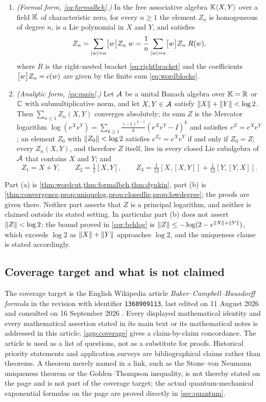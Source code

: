 \begin{theorem}\label{thm:bch}
\begin{enumerate}[label=(\alph*)]
\item \emph{(Formal form, \eqref{eq:formalbch}.)} In the free associative
algebra $\mathbb{K}\langle X,Y\rangle$ over a field $\mathbb{K}$ of characteristic zero,
for every $n\geq1$ the element $Z_n$ is homogeneous of degree $n$, is a Lie
polynomial in $X$ and $Y$, and satisfies
\[
 Z_n=\sum_{|w|=n}\bigl[w\bigr]Z_n\;w
 =\frac1n\sum_{|w|=n}\bigl[w\bigr]Z_n\;R(w),
\]
where $R$ is the right-nested bracket \eqref{eq:rightbracket} and the
coefficients $\bigl[w\bigr]Z_n=c(w)$ are given by the finite sum
\eqref{eq:wordblocks}.
\item \emph{(Analytic form, \eqref{eq:main}.)} Let $\mathcal{A}$ be a unital Banach
algebra over $\mathbb{K}=\mathbb{R}$ or $\mathbb{C}$ with submultiplicative norm, and let
$X,Y\in\mathcal{A}$ satisfy $\left\lVert X\right\rVert+\left\lVert Y\right\rVert<\log2$. Then $\sum_{n\geq1}Z_n(X,Y)$
converges absolutely; its sum $Z$ is the Mercator logarithm
$\log(e^Xe^Y)=\sum_{k\geq1}\frac{(-1)^{k-1}}k(e^Xe^Y-I)^k$ and satisfies
$e^Z=e^Xe^Y$; an element $Z_0$
with $\left\lVert Z_0\right\rVert<\log2$ satisfies $e^{Z_0}=e^Xe^Y$ if and only if $Z_0=Z$;
every $Z_n(X,Y)$, and therefore $Z$ itself, lies in every closed Lie
subalgebra of $\mathcal{A}$ that contains $X$ and $Y$; and
\[
 Z_1=X+Y,\qquad Z_2=\tfrac12[X,Y],\qquad
 Z_3=\tfrac1{12}[X,[X,Y]]+\tfrac1{12}[Y,[Y,X]].
\]
\end{enumerate}
\end{theorem}

Part (a) is \cref{thm:wordcut,thm:formalbch,thm:dynkin}, part (b) is
\cref{thm:convergence,prop:uniquelog,prop:closedlie,prop:lowdegree}; the
proofs are given there. Neither part asserts that $Z$ is a principal
logarithm, and neither is claimed outside its stated setting. In
particular part (b) does not assert $\left\lVert Z\right\rVert<\log2$: the bound proved in
\cref{cor:bchlog} is $\left\lVert Z\right\rVert\leq-\log(2-e^{\left\lVert X\right\rVert+\left\lVert Y\right\rVert})$, which
exceeds $\log2$ as $\left\lVert X\right\rVert+\left\lVert Y\right\rVert$ approaches $\log2$, and the
uniqueness clause is stated accordingly.

\subsection{Coverage target and what is not claimed}
The coverage target is the English Wikipedia article
\emph{Baker--Campbell--Hausdorff formula} in the revision with identifier
\texttt{1368909113}, last edited on 11 August 2026 and consulted on
16 September 2026 \cite{wiki}. Every displayed mathematical identity and every
mathematical assertion stated in its main text or its mathematical notes is
addressed in this article; \cref{app:coverage} gives a claim-by-claim
concordance. The article is used as a list of questions, not as a substitute
for proofs. Historical priority statements and application surveys are
bibliographical claims rather than theorems. A theorem merely named in a link,
such as the Stone--von Neumann uniqueness theorem or the Golden--Thompson
inequality, is not thereby stated on the page and is not part of the coverage
target; the actual quantum-mechanical exponential formulas on the page are
proved directly in \cref{sec:quantum}.


